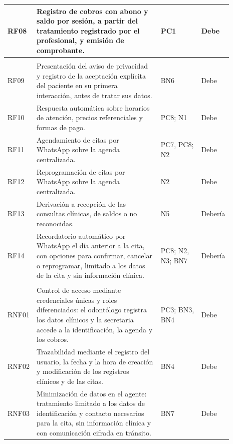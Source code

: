 \begin{longtable}{|>{\centering\arraybackslash}p{0.06\linewidth}|p{0.55\linewidth}|p{0.18\linewidth}|>{\centering\arraybackslash}p{0.10\linewidth}|}
RF08 & Registro de cobros con abono y saldo por sesión, a partir del tratamiento registrado por el profesional, y emisión de comprobante. & PC1 & Debe \\ \hline

\multicolumn{4}{|l|}{\cellcolor{gray!10}\textbf{Requerimientos funcionales: agente conversacional}} \\ \hline

RF09 & Presentación del aviso de privacidad y registro de la aceptación explícita del paciente en su primera interacción, antes de tratar sus datos. & BN6 & Debe \\ \hline

RF10 & Respuesta automática sobre horarios de atención, precios referenciales y formas de pago. & PC8; N1 & Debe \\ \hline

RF11 & Agendamiento de citas por WhatsApp sobre la agenda centralizada. & PC7, PC8; N2 & Debe \\ \hline

RF12 & Reprogramación de citas por WhatsApp sobre la agenda centralizada. & N2 & Debe \\ \hline

RF13 & Derivación a recepción de las consultas clínicas, de saldos o no reconocidas. & N5 & Debería \\ \hline

RF14 & Recordatorio automático por WhatsApp el día anterior a la cita, con opciones para confirmar, cancelar o reprogramar, limitado a los datos de la cita y sin información clínica. & PC8; N2, N3; BN7 & Debería \\ \hline

\multicolumn{4}{|l|}{\cellcolor{gray!10}\textbf{Requerimientos no funcionales}} \\ \hline

RNF01 & Control de acceso mediante credenciales únicas y roles diferenciados: el odontólogo registra los datos clínicos y la secretaria accede a la identificación, la agenda y los cobros. & PC3; BN3, BN4 & Debe \\ \hline

RNF02 & Trazabilidad mediante el registro del usuario, la fecha y la hora de creación y modificación de los registros clínicos y de las citas. & BN4 & Debe \\ \hline

RNF03 & Minimización de datos en el agente: tratamiento limitado a los datos de identificación y contacto necesarios para la cita, sin información clínica y con comunicación cifrada en tránsito. & BN7 & Debe \\ \hline


\end{longtable}
